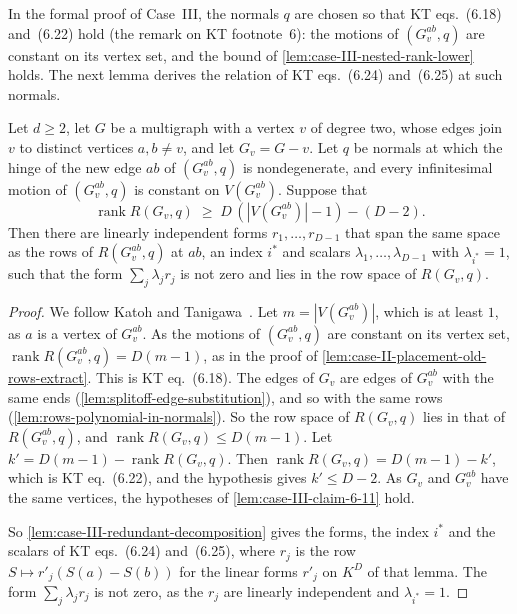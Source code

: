 In the formal proof of Case~III, the normals $q$ are chosen so that KT
eqs.~(6.18) and~(6.22) hold (the remark on KT footnote~6): the motions
of $(G_v^{ab}, q)$ are constant on its vertex set, and the bound of
\cref{lem:case-III-nested-rank-lower} holds. The next lemma derives the
relation of KT eqs.~(6.24) and~(6.25) at such normals.

\begin{lemma}
  \label{lem:case-III-redundant-combination}
  \leanok
  Let $d \ge 2$, let $G$ be a multigraph with a vertex $v$ of degree
  two, whose edges join $v$ to distinct vertices $a, b \neq v$, and let
  $G_v = G - v$. Let $q$ be normals at which the hinge of the new edge
  $ab$ of $(G_v^{ab}, q)$ is nondegenerate, and every infinitesimal
  motion of $(G_v^{ab}, q)$ is constant on $V(G_v^{ab})$. Suppose that
  \[
    \operatorname{rank} R(G_v, q) \;\ge\; D\,(|V(G_v^{ab})| - 1) - (D - 2).
  \]
  Then there are linearly independent forms $r_1, \dots, r_{D-1}$ that
  span the same space as the rows of $R(G_v^{ab}, q)$ at $ab$, an index
  $i^*$ and scalars $\lambda_1, \dots, \lambda_{D-1}$ with
  $\lambda_{i^*} = 1$, such that the form $\sum_j \lambda_j r_j$ is not
  zero and lies in the row space of $R(G_v, q)$.
\end{lemma}
\begin{proof}
  \leanok
  We follow Katoh and Tanigawa~\cite[pp.~682--685]{katohTanigawa2011}.
  Let $m = |V(G_v^{ab})|$, which is at least $1$, as $a$ is a vertex of
  $G_v^{ab}$. As the motions of $(G_v^{ab}, q)$ are constant on its
  vertex set, $\operatorname{rank} R(G_v^{ab}, q) = D(m - 1)$, as in the
  proof of \cref{lem:case-II-placement-old-rows-extract}. This is KT
  eq.~(6.18). The edges of $G_v$ are edges of $G_v^{ab}$ with the same
  ends (\cref{lem:splitoff-edge-substitution}), and so with the same rows
  (\cref{lem:rows-polynomial-in-normals}). So the row space of
  $R(G_v, q)$ lies in that of $R(G_v^{ab}, q)$, and
  $\operatorname{rank} R(G_v, q) \le D(m - 1)$. Let
  $k' = D(m - 1) - \operatorname{rank} R(G_v, q)$. Then
  $\operatorname{rank} R(G_v, q) = D(m - 1) - k'$, which is KT
  eq.~(6.22), and the hypothesis gives $k' \le D - 2$. As $G_v$ and
  $G_v^{ab}$ have the same vertices, the hypotheses of
  \cref{lem:case-III-claim-6-11} hold.

  So \cref{lem:case-III-redundant-decomposition} gives the forms, the
  index $i^*$ and the scalars of KT eqs.~(6.24) and~(6.25), where $r_j$
  is the row $S \mapsto r'_j(S(a) - S(b))$ for the linear forms $r'_j$
  on $K^D$ of that lemma. The form $\sum_j \lambda_j r_j$ is not zero,
  as the $r_j$ are linearly independent and $\lambda_{i^*} = 1$.
\end{proof}


